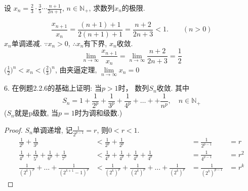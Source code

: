 \begin{qs}
	设 $ x_n = \frac{2}{3}\cdot \frac{3}{5}\cdots\frac{n+1}{2n+1} $, $ n\in\mathbb{N}_+ $, 求数列{$ x_n $}的极限.
\end{qs}
\begin{solve}
	\begin{equation}\label{2.3.2-4-001}
		\frac{x_{n+1}}{x_n} = \frac{(n+1)+1}{2(n+1)+1} = \frac{n+2}{2n+3} < 1.\qquad (n>0)
	\end{equation}
{$ x_n $}单调递减. $ \because x_n>0 $, $ \therefore  ${$ x_n $}有下界, {$ x_n $}收敛.\\
\begin{equation*}
	\lim_{n\rightarrow\infty}\frac{x_{n+1}}{x_n} = \lim_{n\rightarrow\infty} \frac{n+2}{2n+3}  =\frac{1}{2}
\end{equation*}
$ \Big(\frac{1}{2}\Big)^n < x_n < \Big(\frac{2}{3}\Big)^n $, 由夹逼定理, $ \lim\limits_{n\rightarrow\infty} x_n = 0 $
\end{solve}

\begin{qs}
	6. 在例题2.2.6的基础上证明: 当$ p>1 $时， 数列{$ S_n $}收敛. 其中
	\begin{equation*}
		S_n=1+\frac{1}{2^p}+\frac{1}{3^p}+\frac{1}{4^p}+\dots++\frac{1}{n^p}, \quad n\in\mathbb{N}_+
	\end{equation*}
($ S_n $就是p级数, 当$ p=1 $时为调和级数.)
\end{qs}
\begin{proof}
	{$ S_n $}单调递增, 记$ \frac{1}{2^{p-1}}  = r$, 则$ 0<r<1 $.
	\begin{align*}
		\frac{1}{2^p}+\frac{1}{3^p}&<\frac{1}{2^p}+\frac{1}{2^p} &= \frac{1}{2^{p-1}}&=r\\
		\frac{1}{4^p}+\frac{1}{5^p}+\frac{1}{6^p}+\frac{1}{7^p}&<\frac{1}{4^p}+\frac{1}{4^p}+\frac{1}{4^p}+\frac{1}{4^p} &= \frac{1}{4^{p-1}}&=r^2\\
		\frac{1}{(2^k)^p}+\dots+\frac{1}{(2^{k+1}-1)^p}&<\frac{1}{(2^k)^p}+\frac{1}{(2^k)^p}+\dots+\frac{1}{(2^k)^p} &= \frac{1}{(2^k)^{p-1}}&=r^k
	\end{align*}
\end{proof}